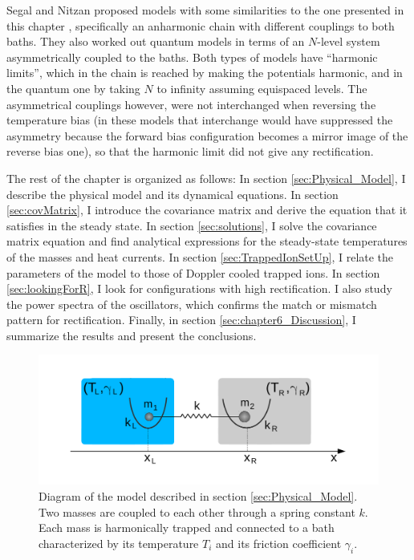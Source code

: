 Segal and Nitzan proposed models with some similarities to the one presented in this chapter \cite{Segal2005,Segal2005b}, specifically an anharmonic chain
with different couplings to both baths. They also worked out quantum models \cite{Segal2005,Segal2005b} in terms of an $N$-level
system asymmetrically coupled to the baths. Both types of models have ``harmonic limits'', which in the chain is reached by making the potentials
harmonic, and in the quantum one by taking $N$ to infinity assuming equispaced levels.
The asymmetrical couplings however, were not interchanged when reversing the temperature bias
(in these models that interchange would have suppressed the asymmetry because the forward bias configuration becomes a mirror image of the reverse bias one), so that
the harmonic limit did not give any rectification.

The rest of the chapter is organized as follows: In section \ref{sec:Physical_Model},
I describe the physical model and its dynamical equations. In section \ref{sec:covMatrix}, I introduce the covariance matrix and derive the equation that it satisfies in the steady state. In section \ref{sec:solutions}, I solve the covariance matrix equation and find analytical expressions for the steady-state temperatures of the masses and heat currents. In section \ref{sec:TrappedIonSetUp}, I relate the parameters of the model to those of Doppler cooled trapped ions. In section \ref{sec:lookingForR}, I look for configurations with high rectification. I also study the power spectra of the oscillators, which confirms the match or mismatch pattern for rectification. Finally, in section \ref{sec:chapter6_Discussion}, I summarize the results and present the conclusions.

\begin{figure}
  \center
  \includegraphics[width=0.9\linewidth]{Figures/model_diagram.pdf}
  \caption{Diagram of the model described in section \ref{sec:Physical_Model}. Two masses are coupled to each other through a spring constant $k$. Each mass is harmonically trapped and connected to a bath characterized by its temperature $T_i$ and its friction coefficient $\gamma_i$. }
  \label{fig:model_diagram}
\end{figure}
%
%
%
%
